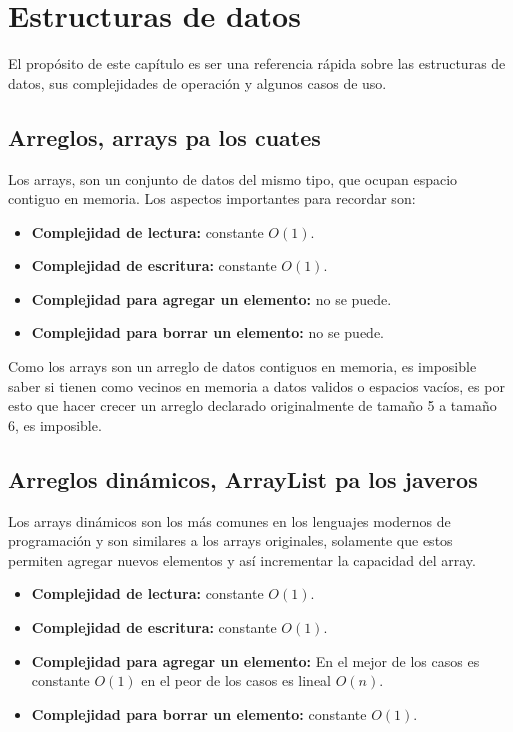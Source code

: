 \chapter{Estructuras de datos}

El propósito de este capítulo es ser una referencia rápida sobre las estructuras de datos, sus complejidades de operación y algunos casos de uso. 

\section{Arreglos, arrays pa los cuates}

Los arrays, son un conjunto de datos del mismo tipo, que ocupan espacio contiguo en memoria. Los aspectos importantes para recordar son:

\begin{itemize}
    \item \textbf{Complejidad de lectura:} constante $O(1)$.
    \item \textbf{Complejidad de escritura:} constante $O(1)$.
    \item \textbf{Complejidad para agregar un elemento:} no se puede.
    \item \textbf{Complejidad para borrar un elemento:} no se puede.
\end{itemize}

Como los arrays son un arreglo de datos contiguos en memoria, es imposible saber si tienen como vecinos en memoria a datos validos o espacios vacíos, es por esto que hacer crecer un arreglo declarado originalmente de tamaño 5 a tamaño 6, es imposible.

\section{Arreglos dinámicos, ArrayList pa los javeros}

Los arrays dinámicos son los más comunes en los lenguajes modernos de programación y son similares a los arrays originales, solamente que estos permiten agregar nuevos elementos y así incrementar la capacidad del array.

\begin{itemize}
    \item \textbf{Complejidad de lectura:} constante $O(1)$.
    \item \textbf{Complejidad de escritura:} constante $O(1)$.
    \item \textbf{Complejidad para agregar un elemento:} En el mejor de los casos es constante $O(1)$ en el peor de los casos es lineal $O(n)$.
    \item \textbf{Complejidad para borrar un elemento:} constante $O(1)$.
\end{itemize}

